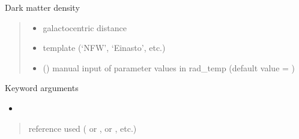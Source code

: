 \documentclass[letterpaper,10pt,english]{sphinxmanual}
\begin{document}
\begin{fulllineitems}
\label{\detokenize{diffsph.profiles:diffsph.profiles.massmodels.rho}}
\pysigstartsignatures
{}
\pysigstopsignatures
\sphinxAtStartPar
Dark matter density
\begin{quote}\begin{description}
\begin{itemize}
\item {} 
\sphinxAtStartPar
{} \textendash{} galactocentric distance

\item {} 
\sphinxAtStartPar
{} \textendash{} template (‘NFW’, ‘Einasto’, etc.)

\item {} 
\sphinxAtStartPar
{} () \textendash{} manual input of parameter values in rad\_temp (default value = )

\end{itemize}

\end{description}\end{quote}

\sphinxAtStartPar
Keyword arguments
\begin{itemize}
\item {} 
\sphinxAtStartPar
{}

\end{itemize}
\begin{quote}\begin{description}
\sphinxAtStartPar
{} \textendash{} reference used ( or \sphinxcode{\sphinxupquote{\textquotesingle{}1309.2641\textquotesingle{}}},  or \sphinxcode{\sphinxupquote{\textquotesingle{}1408.0002\textquotesingle{}}}, etc.)


\end{description}
\end{quote}
\end{fulllineitems}
\end{document}
